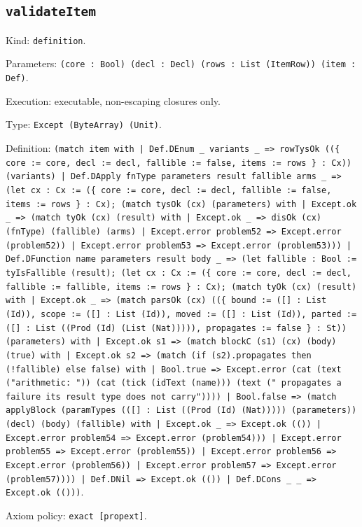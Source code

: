 \documentclass[11pt]{article}
\begin{document}
\subsection*{\texttt{validateItem}}
\noindent Kind: \texttt{definition}.\par
\noindent Parameters: \texttt{(core : Bool) (decl : Decl) (rows : List (ItemRow)) (item : Def)}.\par
\noindent Execution: executable, non-escaping closures only.\par
\noindent Type: \texttt{Except (ByteArray) (Unit)}.\par
\noindent Definition: \texttt{(match item with | Def.DEnum \_ variants \_ => rowTysOk ((\{ core := core, decl := decl, fallible := false, items := rows \} : Cx)) (variants) | Def.DApply fnType parameters result fallible arms \_ => (let cx : Cx := (\{ core := core, decl := decl, fallible := false, items := rows \} : Cx); (match tysOk (cx) (parameters) with | Except.ok \_ => (match tyOk (cx) (result) with | Except.ok \_ => disOk (cx) (fnType) (fallible) (arms) | Except.error problem52 => Except.error (problem52)) | Except.error problem53 => Except.error (problem53))) | Def.DFunction name parameters result body \_ => (let fallible : Bool := tyIsFallible (result); (let cx : Cx := (\{ core := core, decl := decl, fallible := fallible, items := rows \} : Cx); (match tyOk (cx) (result) with | Except.ok \_ => (match parsOk (cx) ((\{ bound := ([] : List (Id)), scope := ([] : List (Id)), moved := ([] : List (Id)), parted := ([] : List ((Prod (Id) (List (Nat))))), propagates := false \} : St)) (parameters) with | Except.ok s1 => (match blockC (s1) (cx) (body) (true) with | Except.ok s2 => (match (if (s2).propagates then (!fallible) else false) with | Bool.true => Except.error (cat (text ("arithmetic: ")) (cat (tick (idText (name))) (text (" propagates a failure its result type does not carry")))) | Bool.false => (match applyBlock (paramTypes (([] : List ((Prod (Id) (Nat))))) (parameters)) (decl) (body) (fallible) with | Except.ok \_ => Except.ok (()) | Except.error problem54 => Except.error (problem54))) | Except.error problem55 => Except.error (problem55)) | Except.error problem56 => Except.error (problem56)) | Except.error problem57 => Except.error (problem57)))) | Def.DNil => Except.ok (()) | Def.DCons \_ \_ => Except.ok (()))}.\par
\noindent Axiom policy: \texttt{exact [propext]}.\par
\end{document}
